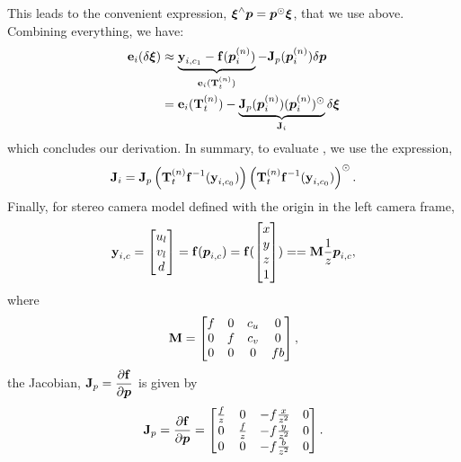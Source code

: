 This leads to the convenient expression, $\boldsymbol{\mathbf{\xi}}^\wedge \boldsymbol{p} = \boldsymbol{p}^\odot \boldsymbol{\mathbf{\xi}}$, that we use above.
Combining everything, we have:
\begin{align}
	\boldsymbol{\mathbf{e}}_i (\delta \boldsymbol{\mathbf{\xi}})  &\approx \underbrace{\boldsymbol{\mathbf{y}}_{i, c_1} -  \boldsymbol{\mathbf{f}}(\boldsymbol{p}_i^{(n)})}_{\boldsymbol{\mathbf{e}}_i(\boldsymbol{\mathbf{T}}_t^{(n)})} -  \boldsymbol{\mathbf{J}}_p(\boldsymbol{p}_i^{(n)})  \delta \boldsymbol{p}  \\
	&=  \boldsymbol{\mathbf{e}}_i(\boldsymbol{\mathbf{T}}_t^{(n)}) - \underbrace{\boldsymbol{\mathbf{J}}_p(\boldsymbol{p}_i^{(n)}) (\boldsymbol{p}_i^{(n)})^\odot}_{\boldsymbol{\mathbf{J}}_i} \delta\boldsymbol{\mathbf{\xi}} \\ 
\end{align}
which concludes our derivation. In summary, to evaluate , we use the expression,
\begin{equation}
\boldsymbol{\mathbf{J}}_i = \boldsymbol{\mathbf{J}}_p\left( \boldsymbol{\mathbf{T}}_t^{(n)} 
    \boldsymbol{\mathbf{f}}^{-1}(\boldsymbol{\mathbf{y}}_{i, c_0})\right) \left( \boldsymbol{\mathbf{T}}_t^{(n)} 
    \boldsymbol{\mathbf{f}}^{-1}(\boldsymbol{\mathbf{y}}_{i, c_0})\right)^\odot.	
\end{equation}
Finally, for stereo camera model defined with the origin in the left camera frame,
 \begin{equation}
	\boldsymbol{\mathbf{y}}_{i, c} = \begin{bmatrix} u_l \\ v_l \\ d  \end{bmatrix}  
  =\boldsymbol{\mathbf{f}}(\boldsymbol{p}_{i,c}) =  \boldsymbol{\mathbf{f}}(\begin{bmatrix} x \\ y \\ z \\ 1 \end{bmatrix}) = 
  = \boldsymbol{\mathbf{M}} \frac{1}{z} \boldsymbol{p}_{i,c},
\end{equation}
where
\begin{equation}
\boldsymbol{\mathbf{M}} = \begin{bmatrix} f & 0 & c_u & 0 \\ 0 & f & c_v & 0 \\ 0 & 0 & 0 & fb \end{bmatrix},
\end{equation}
the Jacobian, $\boldsymbol{\mathbf{J}}_p = \dfrac{\partial \boldsymbol{\mathbf{f}}}{\partial \boldsymbol{p}}$ is given by
\begin{equation}
\boldsymbol{\mathbf{J}}_p = \dfrac{\partial \boldsymbol{\mathbf{f}}}{\partial \boldsymbol{p}} = \begin{bmatrix} \frac{f}{z} & 0 & -f \frac{x}{z^2} & 0 \\ 0 & \frac{f}{z} & -f \frac{y}{z^2} & 0 \\ 0 & 0 & -f \frac{b}{z^2} & 0 \end{bmatrix}.
\end{equation}




 